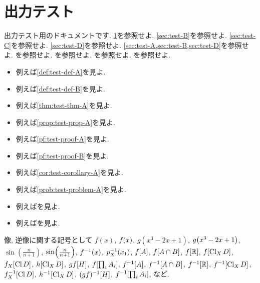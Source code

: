 \documentclass[uplatex, dvipdfmx, a4paper, 12pt, class=jsbook, crop=false]{standalone}
\begin{document}
\section{出力テスト}
\label{sec:test-A}

出力テスト用のドキュメントです.
\cref{sec:test-A}を参照せよ.
\cref{sec:test-B}を参照せよ.
\cref{sec:test-C}を参照せよ.
\cref{sec:test-D}を参照せよ.
\cref{sec:test-A,sec:test-B,sec:test-D}を参照せよ. %
\cite[Theorem~5.6.1]{Engelking1995TD}を参照せよ.
\cite[Theorem~5.6.1, Theorem~5.8.3, Proposition~5.9.10]{Engelking1995TD}を参照せよ.
\cite[132--134]{Morita1981ja}を参照せよ. %
\cite{KodamaNagami1974ja}を参照せよ.

\begin{itemize}
	\item 例えば\cref{def:test-def-A}を見よ.
	\item 例えば\cref{def:test-def-B}を見よ.
	\item 例えば\cref{thm:test-thm-A}を見よ.
	\item 例えば\cref{prop:test-prop-A}を見よ.
	\item 例えば\cref{pf:test-proof-A}を見よ.
	\item 例えば\cref{pf:test-proof-B}を見よ.
	\item 例えば\cref{cor:test-corollary-A}を見よ.
	\item 例えば\cref{prob:test-problem-A}を見よ.
	\item 例えば\cite{KodamaNagami1974ja}を見よ.
	\item 例えば\cite{Morita1981ja}を見よ.
\end{itemize}

像, 逆像に関する記号として
$f(x)$,
$\mappt{f}{x}$,
$g(x^3 - 2x + 1)$,
$\mappt{g}{x^3 - 2x + 1}$,
$\sin(\frac{n}{n+1})$,
$\mappt{\sin}{\frac{n}{n+1}}$,
$\mapinvpt{f}{x}$,
$\mapinvpt{p_X}{x_1}$,
$\mapset{f}{A}$,
$\mapset{f}{A \cap B}$,
$\mapset{f}{\R}$,
$\mapset{f}{\topcl_X D}$,
$\mapset{f_X}{\topcl D}$,
$\mapset{h}{\topcl_X D}$,
$\mapset{gf}{H}$,
$\mapset{f}{\prod_i A_i}$,
$\mapinvset{f}{A}$,
$\mapinvset{f}{A \cap B}$,
$\mapinvset{f}{\R}$,
$\mapinvset{f}{\topcl_X D}$,
$\mapinvset{f_X}{\topcl D}$,
$\mapinvset{h}{\topcl_X D}$,
$\mapinvset{(gf)}{H}$,
$\mapinvset{f}{\prod_i A_i}$,
など.

\begin{definition}
	\label{def:test-def-A}
	\lipsum[1][1-4]
\end{definition}
\end{document}
